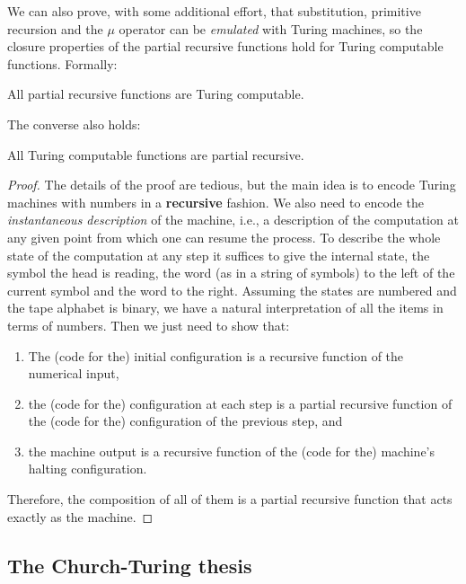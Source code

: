 \documentclass[../main.tex]{memoir}
\begin{document}
We can also prove, with some additional effort, that substitution, primitive recursion and the $\mu$ operator can be \textit{emulated} with Turing machines, so the closure properties of the partial recursive functions hold for Turing computable functions. Formally:

\begin{theorem}
  All partial recursive functions are Turing computable.
\end{theorem}

The converse also holds:

\begin{theorem}
  All Turing computable functions are partial recursive.
\end{theorem}
\begin{proof}
  The details of the proof are tedious, but the main idea is to encode Turing machines with numbers in a \textbf{recursive} fashion. We also need to encode the \textit{instantaneous description} of the machine, i.e., a description of the computation at any given point from which one can resume the process. To describe the whole state of the computation at any step it suffices to give the internal state, the symbol the head is reading, the word (as in a string of symbols) to the left of the current symbol and the word to the right. Assuming the states are numbered and the tape alphabet is binary, we have a natural interpretation of all the items in terms of numbers. Then we just need to show that:

  \begin{enumerate}
  \item The (code for the) initial configuration is a recursive function of the numerical input,
  \item the (code for the) configuration at each step is a partial recursive function of the (code for the) configuration of the previous step, and
  \item the machine output is a recursive function of the (code for the) machine's halting configuration.
  \end{enumerate}

  Therefore, the composition of all of them is a partial recursive function that acts exactly as the machine.
\end{proof}

\subsection{The Church-Turing thesis}
\end{document}
